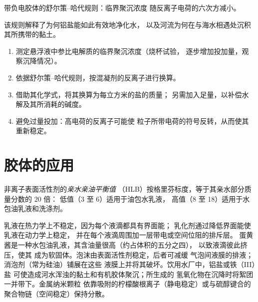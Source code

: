\begin{omfigure}

{\small 带负电胶体的舒尔策–哈代规则：临界聚沉浓度
随反离子电荷的六次方减小。}
\end{omfigure}

该规则解释了为何铝盐能如此有效地净化水，
以及河流为何在与海水相遇处沉积其所携带的黏土。

\begin{method}[选择混凝剂的投加量]\label{met:b3:colloids:coagulant-dose}
\begin{enumerate}
  \item 测定悬浮液中参比电解质的临界聚沉浓度（烧杯试验，
        逐步增加投加量，观察沉降情况）。
  \item 依据舒尔策–哈代规则，按混凝剂的反离子进行换算。
  \item 借助其化学式，将其换算为每立方米的盐的质量；
        另需加入足量，以补偿水解及其所消耗的碱度。
  \item 避免过量投加：高电荷的反离子可能使
        粒子所带电荷的符号反转，从而使其重新稳定。
\end{enumerate}
\end{method}

\section{胶体的应用}

\begin{definition}[亲水亲油平衡值]\label{def:b3:colloids:hlb}
非离子表面活性剂的\emph{亲水亲油平衡值}
（HLB）按格里芬标度，等于其亲水部分质量分数的 $20$ 倍：
低值（3 至 6）适用于油包水乳液，
高值（8 至 18）适用于水包油乳液和洗涤剂。
\end{definition}

乳液在热力学上不稳定，因为每个液滴都具有界面能；
乳化剂通过降低界面能使乳液在动力学上稳定，
并在每个液滴周围加一层带电或空间位阻的排斥层。
蛋黄酱是一种水包油乳液，其含油量很高（约占体积的五分之四），
以致液滴彼此挤压，使其
成为软固体。泡沫由表面活性剂稳定，后者可减缓
气泡间液膜的排液；消泡剂（常为硅油）铺展在这些
液膜上并将其破坏。饮用水厂中，铝盐或铁（III）盐
可使造成河水浑浊的黏土和有机胶体聚沉；所生成的
氢氧化物在沉降时将絮团一并带下。金属纳米颗粒
依靠吸附的柠檬酸根离子（静电稳定）或与硫醇键合的
聚合物链（空间稳定）保持分散。

